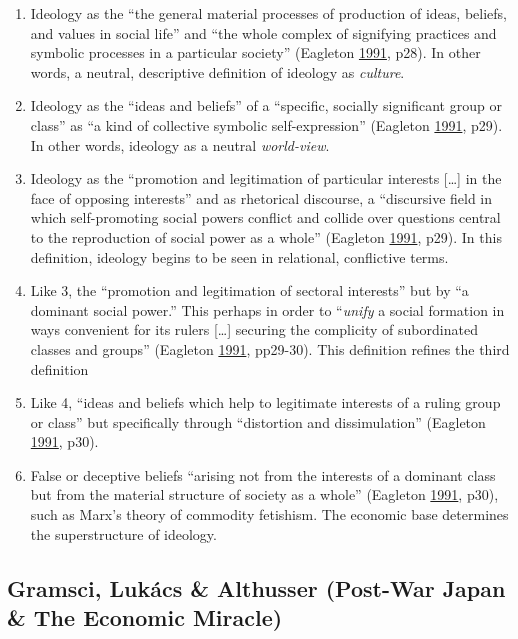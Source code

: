 \documentclass[10pt,british,A4paper,,openany]{memoir}
\providecommand{\tightlist}{%
  \setlength{\itemsep}{0pt}\setlength{\parskip}{0pt}}
\begin{document}
\begin{enumerate}
\def\labelenumi{\arabic{enumi}.}
\tightlist
\item
  Ideology as the ``the general material processes of production of
  ideas, beliefs, and values in social life'' and ``the whole complex of
  signifying practices and symbolic processes in a particular society''
  (Eagleton \protect\hyperlink{ref-eagleton_ideology:_1991}{1991}, p28).
  In other words, a neutral, descriptive definition of ideology as
  \emph{culture}.
\item
  Ideology as the ``ideas and beliefs'' of a ``specific, socially
  significant group or class'' as ``a kind of collective symbolic
  self-expression'' (Eagleton
  \protect\hyperlink{ref-eagleton_ideology:_1991}{1991}, p29). In other
  words, ideology as a neutral \emph{world-view}.
\item
  Ideology as the ``promotion and legitimation of particular interests
  {[}\ldots{}{]} in the face of opposing interests'' and as rhetorical
  discourse, a ``discursive field in which self-promoting social powers
  conflict and collide over questions central to the reproduction of
  social power as a whole'' (Eagleton
  \protect\hyperlink{ref-eagleton_ideology:_1991}{1991}, p29). In this
  definition, ideology begins to be seen in relational, conflictive
  terms.
\item
  Like 3, the ``promotion and legitimation of sectoral interests'' but
  by ``a dominant social power.'' This perhaps in order to
  ``\emph{unify} a social formation in ways convenient for its rulers
  {[}\ldots{}{]} securing the complicity of subordinated classes and
  groups'' (Eagleton
  \protect\hyperlink{ref-eagleton_ideology:_1991}{1991}, pp29-30). This
  definition refines the third definition
\item
  Like 4, ``ideas and beliefs which help to legitimate interests of a
  ruling group or class'' but specifically through ``distortion and
  dissimulation'' (Eagleton
  \protect\hyperlink{ref-eagleton_ideology:_1991}{1991}, p30).
\item
  False or deceptive beliefs ``arising not from the interests of a
  dominant class but from the material structure of society as a whole''
  (Eagleton \protect\hyperlink{ref-eagleton_ideology:_1991}{1991}, p30),
  such as Marx's theory of commodity fetishism. The economic base
  determines the superstructure of ideology.
\end{enumerate}

\subsection{Gramsci, Lukács \& Althusser (Post-War Japan \& The Economic
Miracle)}\label{gramsci-lukuxe1cs-althusser-post-war-japan-the-economic-miracle}
\end{document}
